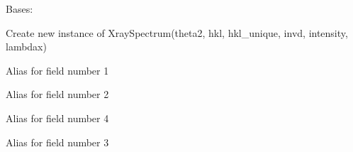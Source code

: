 \documentclass[letterpaper,10pt,english]{sphinxmanual}
\begin{document}

\begin{fulllineitems}
\label{doctree/soprano.calculate.xrd.xrd:soprano.calculate.xrd.xrd.XraySpectrum}
Bases: 

Create new instance of XraySpectrum(theta2, hkl, hkl\_unique, invd, intensity, lambdax)

\begin{fulllineitems}
\label{doctree/soprano.calculate.xrd.xrd:soprano.calculate.xrd.xrd.XraySpectrum.hkl}
Alias for field number 1

\end{fulllineitems}


\begin{fulllineitems}
\label{doctree/soprano.calculate.xrd.xrd:soprano.calculate.xrd.xrd.XraySpectrum.hkl_unique}
Alias for field number 2

\end{fulllineitems}


\begin{fulllineitems}
\label{doctree/soprano.calculate.xrd.xrd:soprano.calculate.xrd.xrd.XraySpectrum.intensity}
Alias for field number 4

\end{fulllineitems}


\begin{fulllineitems}
\label{doctree/soprano.calculate.xrd.xrd:soprano.calculate.xrd.xrd.XraySpectrum.invd}
Alias for field number 3

\end{fulllineitems}



\end{fulllineitems}
\end{document}
